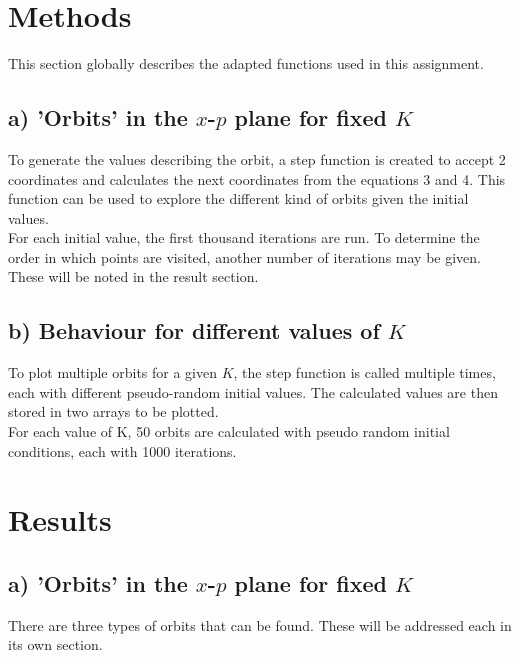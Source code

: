 \documentclass[a4paper,11pt]{article}
\begin{document}
\section{Methods}
This section globally describes the adapted functions used in this assignment.

\subsection*{a) 'Orbits' in the $x$-$p$ plane for fixed $K$}
To generate the values describing the orbit, a step function is created to accept 2 coordinates and calculates the next coordinates from the equations 3 and 4.
This function can be used to explore the different kind of orbits given the initial values.\\
For each initial value, the first thousand iterations are run. To determine the order in which points are visited, another number of iterations may be given. These will be noted in the result section.\\

\subsection*{b) Behaviour for different values of $K$}
To plot multiple orbits for a given $K$, the step function is called multiple times, each with different pseudo-random initial values. The calculated values are then stored in two arrays to be plotted.\\
For each value of K, 50 orbits are calculated with pseudo random initial conditions, each with 1000 iterations.

\section{Results}
\subsection{a) 'Orbits' in the $x$-$p$ plane for fixed $K$}
There are three types of orbits that can be found. These will be addressed each in its own section.
\end{document}
